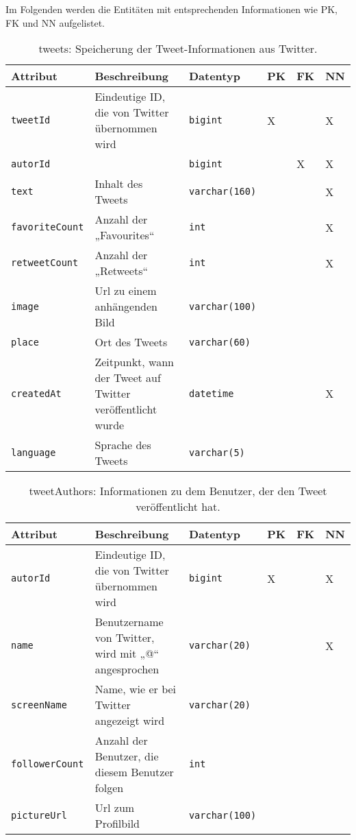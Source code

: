  Im Folgenden werden die Entitäten mit entsprechenden Informationen wie \ac{PK}, \ac{FK} und \ac{NN} aufgelistet.
\begin{table}[!ht]
	\caption{tweets: Speicherung der Tweet-Informationen aus Twitter. }
	\begin{tabular}{p{3cm}p{5cm}p{2cm}p{1cm}p{1cm}p{1cm}}
    \toprule 
    \textbf{Attribut} & \textbf{Beschreibung} & \textbf{Datentyp} & \textbf{PK} & \textbf{FK} & \textbf{NN} \\
    \hline 
    \texttt{tweetId} & Eindeutige ID, die von Twitter übernommen wird & \texttt{bigint} & X & & X   \\
    \texttt{autorId} &  & \texttt{bigint} & & X & X   \\
    \texttt{text} & Inhalt des Tweets  & \texttt{varchar(160)} & & & X   \\
    \texttt{favoriteCount} & Anzahl der „Favourites“  & \texttt{int} & & & X   \\
    \texttt{retweetCount} & Anzahl der „Retweets“ & \texttt{int} & & & X   \\
    \texttt{image} & Url zu einem anhängenden Bild & \texttt{varchar(100)} & & &   \\
    \texttt{place} & Ort des Tweets & \texttt{varchar(60)} & & &   \\
    \texttt{createdAt} & Zeitpunkt, wann der Tweet auf Twitter veröffentlicht wurde & \texttt{datetime} & & & X   \\
    \texttt{language} & Sprache des Tweets & \texttt{varchar(5)} & & &   \\
	\bottomrule
  \end{tabular}
\end{table}

\begin{table}[!ht]
	\caption{tweetAuthors: Informationen zu dem Benutzer, der den Tweet veröffentlicht hat. }
    \begin{tabular}{p{3cm}p{5cm}p{2cm}p{1cm}p{1cm}p{1cm}}
    \toprule 
    \textbf{Attribut} & \textbf{Beschreibung} & \textbf{Datentyp} & \textbf{PK} & \textbf{FK} & \textbf{NN} \\
    \hline 
    \texttt{autorId} & Eindeutige ID, die von Twitter übernommen wird & \texttt{bigint} & X && X   \\
    \texttt{name} & Benutzername von Twitter, wird mit „@“ angesprochen & \texttt{varchar(20)} & & & X   \\
    \texttt{screenName} & Name, wie er bei Twitter angezeigt wird  & \texttt{varchar(20)} & & &   \\
    \texttt{followerCount } & Anzahl der Benutzer, die diesem Benutzer folgen   & \texttt{int} & & &   \\
    \texttt{pictureUrl} & Url zum Profilbild & \texttt{varchar(100)} & & &   \\
   	\bottomrule
  \end{tabular}
\end{table}
      
